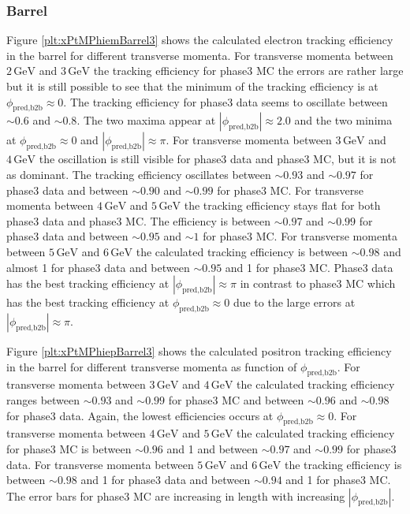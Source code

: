 \documentclass[a4paper,11pt,twosided,final,german,openbib,pdftex,listof=totoc,bibliography=totoc]{scrbook}
\begin{document}
\newpage
\subsubsection{Barrel}


Figure \ref{plt:xPtMPhiemBarrel3} shows the calculated electron tracking efficiency in the barrel for different transverse momenta.
For transverse momenta between $2\,\textrm{GeV}$ and $3\,\textrm{GeV}$ the tracking efficiency for phase3 MC the errors are rather large but it is still possible to see that the minimum of the tracking efficiency is at $\phi_{\textrm{pred,b2b}} \approx 0$. The tracking efficiency for phase3 data seems to oscillate between $\sim 0.6$ and $\sim 0.8$. The two maxima appear at $|\phi_{\textrm{pred,b2b}}| \approx 2.0$ and the two minima at $\phi_{\textrm{pred,b2b}} \approx 0$ and $|\phi_{\textrm{pred,b2b}}| \approx \pi$.
For transverse momenta between $3\,\textrm{GeV}$ and $4\,\textrm{GeV}$ the oscillation is still visible for phase3 data and phase3 MC, but it is not as dominant. The tracking efficiency oscillates between $\sim 0.93$ and  $\sim 0.97$ for phase3 data and between $\sim 0.90$ and $\sim 0.99$ for phase3 MC.
For transverse momenta between $4\,\textrm{GeV}$ and $5\,\textrm{GeV}$ the tracking efficiency stays flat for both phase3 data and phase3 MC. The efficiency is between $\sim 0.97$ and $\sim 0.99$ for phase3 data and between $\sim 0.95$ and $\sim 1$ for phase3 MC.
For transverse momenta between $5\,\textrm{GeV}$ and $6\,\textrm{GeV}$ the calculated tracking efficiency is between $\sim 0.98$ and almost 1 for phase3 data and between $\sim 0.95$ and 1 for phase3 MC. Phase3 data has the best tracking efficiency at $|\phi_{\textrm{pred,b2b}}| \approx \pi$ in contrast to phase3 MC which has the best tracking efficiency at $\phi_{\textrm{pred,b2b}} \approx 0$ due to the large errors at $|\phi_{\textrm{pred,b2b}}| \approx \pi$. 

Figure \ref{plt:xPtMPhiepBarrel3} shows the calculated positron tracking efficiency in the barrel for different transverse momenta as function of $\phi_{\textrm{pred,b2b}}$.
For transverse momenta between $3\,\textrm{GeV}$ and $4\,\textrm{GeV}$ the calculated tracking efficiency ranges between $\sim 0.93$ and $\sim 0.99$ for phase3 MC and between $\sim 0.96$ and $\sim 0.98$ for phase3 data. Again, the lowest efficiencies occurs at $\phi _{\textrm{pred,b2b}}\approx 0$.
For transverse momenta between $4\,\textrm{GeV}$ and $5\,\textrm{GeV}$ the calculated tracking efficiency for phase3 MC is between $\sim 0.96$ and 1 and between $\sim 0.97$ and $\sim 0.99$ for phase3 data. 
For transverse momenta between $5\,\textrm{GeV}$ and $6\,\textrm{GeV}$ the tracking efficiency is between $\sim 0.98$ and 1 for phase3 data and between $\sim 0.94$ and 1 for phase3 MC. The error bars for phase3 MC are increasing in length with increasing $|\phi_{\textrm{pred,b2b}}|$.
\end{document}
